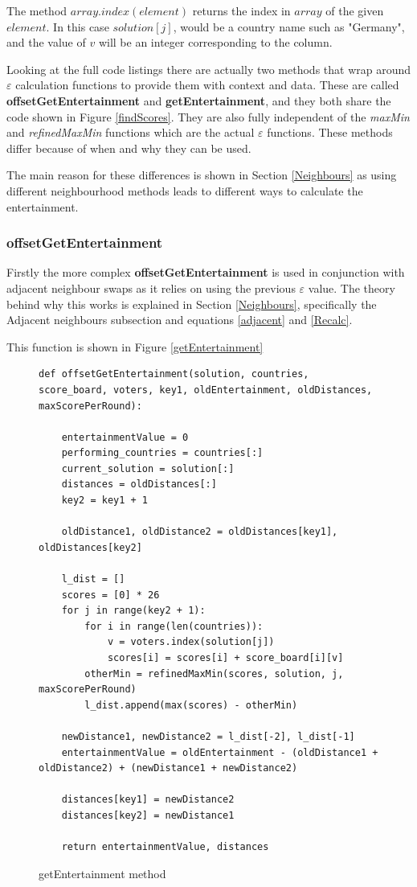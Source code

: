 \documentclass[12pt]{report}
\begin{document}
The method $array.index(element)$ returns the index in $array$ of the given $element$. In this case $solution[j]$, would be a country name such as "Germany", and the value of $v$ will be an integer corresponding to the column.

Looking at the full code listings there are actually two methods that wrap around $\varepsilon$ calculation functions to provide them with context and data. These are called \textbf{offsetGetEntertainment} and \textbf{getEntertainment}, and they both share the code shown in Figure \ref{findScores}. They are also fully independent of the \textit{maxMin} and \textit{refinedMaxMin} functions which are the actual $\varepsilon$ functions. These methods differ because of when and why they can be used.

The main reason for these differences is shown in Section \ref{Neighbours} as using different neighbourhood methods leads to different ways to calculate the entertainment. 

\subsubsection{offsetGetEntertainment}
Firstly the more complex \textbf{offsetGetEntertainment} is used in conjunction with adjacent neighbour swaps as it relies on using the previous $\varepsilon$ value. The theory behind why this works is explained in Section \ref{Neighbours}, specifically the Adjacent neighbours subsection and equations \ref{adjacent} and \ref{Recalc}.

This function is shown in Figure \ref{getEntertainment}

\begin{figure}[H]
\caption{getEntertainment method}
\label{offsetGetEntertainment}
\begin{lstlisting}
def offsetGetEntertainment(solution, countries, score_board, voters, key1, oldEntertainment, oldDistances, maxScorePerRound):
    
    entertainmentValue = 0
    performing_countries = countries[:]
    current_solution = solution[:]
    distances = oldDistances[:]
    key2 = key1 + 1

    oldDistance1, oldDistance2 = oldDistances[key1], oldDistances[key2]

    l_dist = []
    scores = [0] * 26
    for j in range(key2 + 1):
        for i in range(len(countries)):
            v = voters.index(solution[j])
            scores[i] = scores[i] + score_board[i][v]
        otherMin = refinedMaxMin(scores, solution, j, maxScorePerRound)
        l_dist.append(max(scores) - otherMin)
    
    newDistance1, newDistance2 = l_dist[-2], l_dist[-1]
    entertainmentValue = oldEntertainment - (oldDistance1 + oldDistance2) + (newDistance1 + newDistance2)
    
    distances[key1] = newDistance2
    distances[key2] = newDistance1
    
    return entertainmentValue, distances
\end{lstlisting}
\end{figure}
\end{document}
